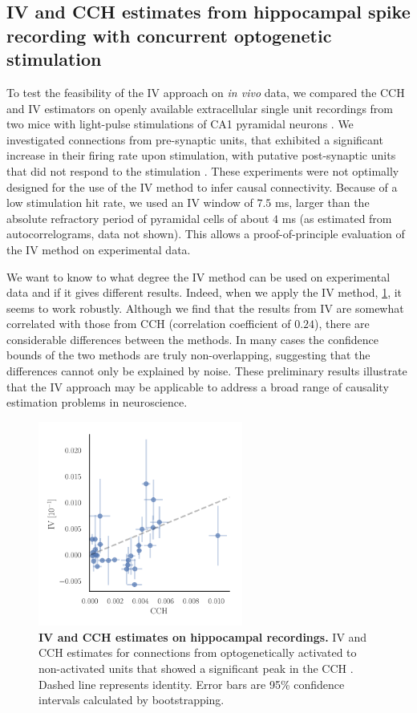 \documentclass[11pt]{article}
\begin{document}
\subsection{IV and CCH estimates from hippocampal spike recording with concurrent optogenetic stimulation}
To test the feasibility of the IV approach on \textit{in vivo} data, we compared the CCH and IV estimators on openly available extracellular single unit recordings from two mice with light-pulse stimulations of CA1 pyramidal neurons \citep{English2017}.
We investigated connections from pre-synaptic units, that exhibited a significant increase in their firing rate upon stimulation, with putative post-synaptic units that did not respond to the stimulation \citep{English2017}. 
These experiments were not optimally designed for the use of the IV method to infer causal connectivity.
Because of a low stimulation hit rate, we used an IV window of $ 7.5 $ ms, larger than the absolute refractory period of pyramidal cells of about $ 4 $ ms (as estimated from autocorrelograms, data not shown).
This allows a proof-of-principle evaluation of the IV method on experimental data.

We want to know to what degree the IV method can be used on experimental data and if it gives different results. 
Indeed, when we apply the IV method, \cref{fig:optodata}, it seems to work robustly. 
Although we find that the results from IV are somewhat correlated with those from CCH (correlation coefficient of $0.24$), there are considerable differences between the methods. 
In many cases the confidence bounds of the two methods are truly non-overlapping, suggesting that the differences cannot only be explained by noise. 
These preliminary results illustrate that the IV approach may be applicable to address a broad range of causality estimation problems in neuroscience.  

\begin{figure}
\makeatletter
\renewcommand\p@subfigure{}
\makeatother
\centering
\includegraphics[width=0.6\textwidth]{Optodata_comparisonIV_CCH.pdf}
\caption{\textbf{IV and CCH estimates on hippocampal recordings.}
IV and CCH estimates for connections from optogenetically activated to non-activated units that showed a significant peak in the CCH \citep{English2017}.
Dashed line represents identity. 
Error bars are 95\% confidence intervals calculated by bootstrapping.
}
\label{fig:optodata}
 \end{figure}
\FloatBarrier
\end{document}
